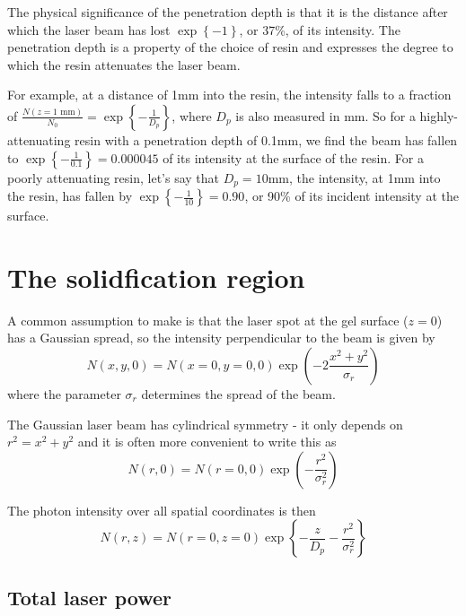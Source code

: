 The physical significance of the penetration depth is that it is the distance after which the laser beam has lost $\exp \left\{ -1 \right\}$, or 37\%, of its intensity. The penetration depth is a property of the choice of resin and expresses the degree to which the resin attenuates the laser beam. 

For example, at a distance of 1mm into the resin, the intensity falls to a fraction of $\frac{N\left( z = \textrm{1 mm} \right)}{ N_{0} } =  \exp \left\{ - \frac{1}{D_{p}} \right\}$, where $D_{p}$ is also measured in mm. So for a highly-attenuating resin with a penetration depth of 0.1mm, we find the beam has fallen to $\exp \left\{ - \frac{1}{0.1} \right\} = 0.000045$ of its intensity at the surface of the resin. For a poorly attenuating resin, let's say that $D_{p} = 10$mm, the intensity, at 1mm into the resin, has fallen by $\exp \left\{ - \frac{1}{10} \right\} = 0.90$, or 90\% of its incident intensity at the surface.\\[1cm] 


\section{The solidfication region}

A common assumption to make is that the laser spot at the gel surface ($z=0$) has a Gaussian spread, so the intensity perpendicular to the beam is given by
\begin{equation}
 N\left(x,y,0 \right) = N\left(x=0,y=0,0 \right) \exp\left( - 2\frac{x^{2}+y^{2}}{\sigma_{r}} \right) 
\end{equation}
where the parameter $\sigma_{r}$ determines the spread of the beam. 

The Gaussian laser beam has cylindrical symmetry - it only depends on $r^{2} = x^{2}+y^{2}$ and it is often more convenient to write this as 
\begin{equation}
 N\left(r, 0 \right) = N\left(r=0, 0 \right) \exp\left( - \frac{r^{2}}{\sigma_{r}^{2}} \right) 
\end{equation}

The photon intensity over all spatial coordinates is then 
\begin{equation}
N\left(r,z\right)  = N\left(r=0,z=0\right) \exp \left\{ - \frac{z}{D_{p}} - \frac{r^{2}}{\sigma_{r}^{2}}  \right\}
\end{equation}

\subsection{Total laser power}


